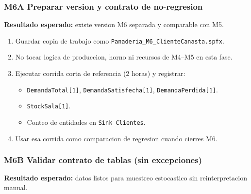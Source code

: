 \documentclass[11pt]{article}
\newcommand{\simio}[1]{\texttt{#1}}
\newcommand{\state}[1]{\texttt{#1}}
\begin{document}
\subsubsection{M6A Preparar version y contrato de no-regresion}
\textbf{Resultado esperado:} existe version M6 separada y comparable con M5.

\begin{enumerate}
  \item Guardar copia de trabajo como \simio{Panaderia\_M6\_ClienteCanasta.spfx}.
  \item No tocar logica de produccion, horno ni recursos de M4--M5 en esta fase.
  \item Ejecutar corrida corta de referencia (2 horas) y registrar:
  \begin{itemize}
    \item \state{DemandaTotal[1]}, \state{DemandaSatisfecha[1]}, \state{DemandaPerdida[1]}.
    \item \state{StockSala[1]}.
    \item Conteo de entidades en \simio{Sink\_Clientes}.
  \end{itemize}
  \item Usar esa corrida como comparacion de regresion cuando cierres M6.
\end{enumerate}

\subsubsection{M6B Validar contrato de tablas (sin excepciones)}
\textbf{Resultado esperado:} datos listos para muestreo estocastico sin reinterpretacion manual.
\end{document}
